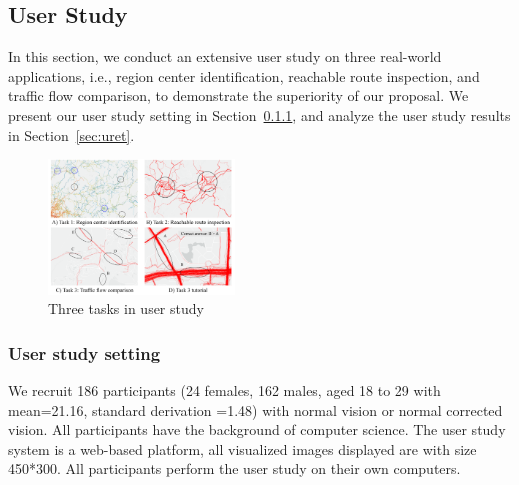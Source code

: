 \subsection{User Study}\label{sec:user}
In this section, we conduct an extensive user study on three real-world applications, i.e., region center identification, reachable route inspection, and traffic flow comparison, to demonstrate the superiority of our proposal.
We present our user study setting in Section~\ref{sec:uset}, and analyze the user study results in Section~\ref{sec:uret}.



\begin{figure}[t]
	\centering
	\includegraphics[width=0.44\textwidth]{pictures/user_study/interface.pdf}
	\vspace{-3mm}
	\caption{Three tasks in user study}
	\label{fig:apps}
	\vspace{-6mm}
\end{figure}

\subsubsection{User study setting}\label{sec:uset}

We recruit 186 participants (24 females, 162 males, aged 18 to 29 with mean=21.16, standard derivation =1.48) with normal vision or normal corrected vision.
All participants have the background of computer science.
The user study system is a web-based platform, all visualized images displayed are with size 450*300.
All participants perform the user study on their own computers.


